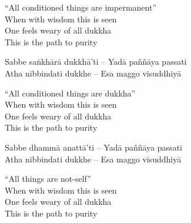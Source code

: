 \begin{english-verses}
  ``All conditioned things are impermanent''\hyperlink{endnote34-appendix}{\hypertarget{endnote34-body}{}}\\
  When with wisdom this is seen\\
  One feels weary of all dukkha\hyperlink{endnote35-appendix}{\hypertarget{endnote35-body}{}}\\
  This is the path to purity
\end{english-verses}

\begin{verses}
  Sabbe saṅkhārā dukkhā'ti – Yadā paññāya passati\\
  Atha nibbindati dukkhe – Esa maggo visuddhiyā
\end{verses}

\begin{english-verses}
  ``All conditioned things are dukkha''\\
  When with wisdom this is seen\\
  One feels weary of all dukkha\\
  This is the path to purity
\end{english-verses}

\begin{verses}
  Sabbe dhammā anattā'ti – Yadā paññāya passati\\
  Atha nibbindati dukkhe – Esa maggo visuddhiyā
\end{verses}

\begin{english-verses}
  ``All things are not-self''\hyperlink{endnote36-appendix}{\hypertarget{endnote36-body}{}}\\
  When with wisdom this is seen\\
  One feels weary of all dukkha\\
  This is the path to purity
\end{english-verses}

\suttaRef{[Dhp 183-185]}

